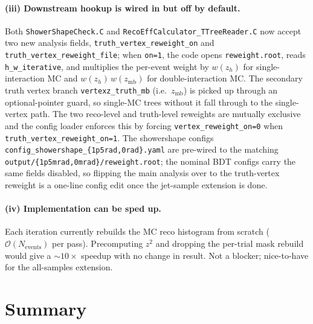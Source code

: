 \documentclass[11pt,a4paper]{article}
\begin{document}
\paragraph{(iii) Downstream hookup is wired in but off by default.}
Both \texttt{ShowerShapeCheck.C} and
\texttt{RecoEffCalculator\_TTreeReader.C} now accept two new analysis
fields, \texttt{truth\_vertex\_reweight\_on} and
\texttt{truth\_vertex\_reweight\_file}; when \texttt{on=1}, the code
opens \texttt{reweight.root}, reads \texttt{h\_w\_iterative}, and
multiplies the per-event weight by $w(z_h)$ for single-interaction MC
and $w(z_h)\,w(z_\mathrm{mb})$ for double-interaction MC. The
secondary truth vertex branch \texttt{vertexz\_truth\_mb} (i.e.\ $z_\mathrm{mb}$)
is picked up through an optional-pointer guard, so single-MC trees
without it fall through to the single-vertex path. The two reco-level
and truth-level reweights are mutually exclusive and the config
loader enforces this by forcing \texttt{vertex\_reweight\_on=0}
when \texttt{truth\_vertex\_reweight\_on=1}. The showershape configs
\texttt{config\_showershape\_\{1p5rad,0rad\}.yaml} are pre-wired to
the matching \texttt{output/\{1p5mrad,0mrad\}/reweight.root}; the
nominal BDT configs carry the same fields disabled, so flipping the
main analysis over to the truth-vertex reweight is a one-line config
edit once the jet-sample extension is done.

\paragraph{(iv) Implementation can be sped up.}
Each iteration currently rebuilds the MC reco histogram from scratch
($\mathcal{O}(N_\mathrm{events})$ per pass). Precomputing $z^2$ and
dropping the per-trial mask rebuild would give a $\sim\!10\times$
speedup with no change in result. Not a blocker; nice-to-have for the
all-samples extension.

\section{Summary}
\label{sec:summary}
\end{document}
